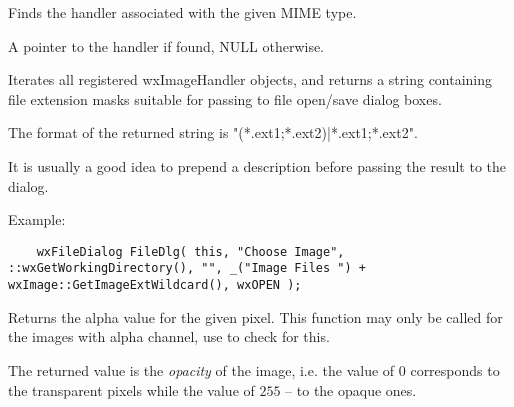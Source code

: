 Finds the handler associated with the given MIME type.






A pointer to the handler if found, NULL otherwise.




\label{wximagegetimageextwildcard}


Iterates all registered wxImageHandler objects, and returns a string containing file extension masks
suitable for passing to file open/save dialog boxes.


The format of the returned string is "(*.ext1;*.ext2)|*.ext1;*.ext2".

It is usually a good idea to prepend a description before passing the result to the dialog.

Example:

\begin{verbatim}
    wxFileDialog FileDlg( this, "Choose Image", ::wxGetWorkingDirectory(), "", _("Image Files ") + wxImage::GetImageExtWildcard(), wxOPEN );
\end{verbatim}




\label{wximagegetalpha}


Returns the alpha value for the given pixel. This function may only be called
for the images with alpha channel, use  to
check for this.

The returned value is the {\it opacity} of the image, i.e. the value of $0$
corresponds to the transparent pixels while the value of $255$ -- to the opaque
ones.


